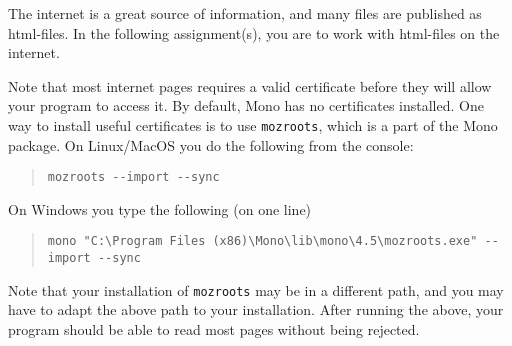 The internet is a great source of information, and many files are
published as html-files. In the following assignment(s), you are to
work with html-files on the internet.

Note that most internet pages requires a valid certificate before they will allow your program to access it. By default, Mono has no certificates installed. One way to install useful certificates is to use \lstinline[language=console]{mozroots}, which is a part of the Mono package. On Linux/MacOS you do the following from the console:
  \begin{quote}
    \lstinline[language=console]{mozroots --import --sync}
  \end{quote}
On Windows you type the following (on one line)
  \begin{quote}
    \lstinline[language=console]{mono "C:\Program Files (x86)\Mono\lib\mono\4.5\mozroots.exe" --import --sync}
  \end{quote}
Note that your installation of \lstinline[language=console]{mozroots} may be in a different path, and you may have to adapt the above path to your installation. After running the above, your program should be able to read most pages without being rejected.
